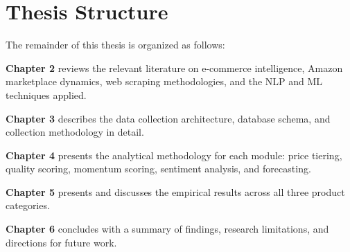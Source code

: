 \section{Thesis Structure}

The remainder of this thesis is organized as follows:

\textbf{Chapter 2} reviews the relevant literature on e-commerce intelligence, Amazon
marketplace dynamics, web scraping methodologies, and the NLP and ML techniques applied.

\textbf{Chapter 3} describes the data collection architecture, database schema, and
collection methodology in detail.

\textbf{Chapter 4} presents the analytical methodology for each module: price tiering,
quality scoring, momentum scoring, sentiment analysis, and forecasting.

\textbf{Chapter 5} presents and discusses the empirical results across all three product
categories.

\textbf{Chapter 6} concludes with a summary of findings, research limitations, and
directions for future work.
